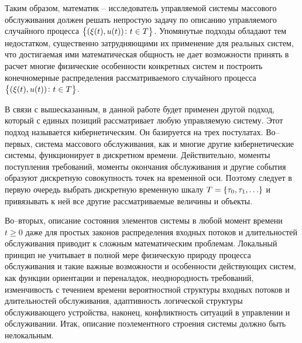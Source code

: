 \documentclass[a4paper,12pt,russian]{extarticle}
\begin{document}
Таким образом, математик -- исследователь управляемой системы массового обслуживания должен решать непростую задачу по описанию управляемого случайного процесса $\left\{(\xi(t), u(t)) \colon t \in T\right\}$. Упомянутые подходы обладают тем недостатком, существенно затрудняющими их применение для реальных систем, что достигаемая ими математическая общность не дает возможности принять в расчет многие физические особенности конкретных систем и построить конечномерные распределения рассматриваемого случайного процесса $\left\{(\xi(t), u(t)) \colon t \in T\right\}$.

В связи с вышесказанным, в данной работе будет применен другой подход, который с единых позиций рассматривает любую управляемую систему. Этот подход называется кибернетическим. Он базируется на трех постулатах. Во--первых, система массового обслуживания, как и многие другие кибернетические системы, функционирует в дискретном времени. Действительно, моменты поступления требований, моменты окончания обслуживания и другие события образуют дискретную совокупность точек на временной оси. Поэтому следует в первую очередь выбрать дискретную временную шкалу $T=\left\{\tau_0, \tau_1, \ldots\right\}$ и привязывать к ней все другие рассматриваемые величины и объекты. 

Во--вторых, описание состояния элементов системы в любой момент времени $t \geqslant 0$ даже для простых законов распределения входных потоков и длительностей обслуживания приводит к сложным математическим проблемам. Локальный принцип не учитывает в полной мере физическую природу процесса обслуживания и такие важные возможности и особенности действующих систем, как функции ориентации и переналадок, неоднородность требований, изменчивость с течением времени вероятностной структуры входных потоков и длительностей обслуживания, адаптивность логической структуры обслуживающего устройства, наконец, конфликтность ситуаций в управлении и обслуживании. Итак, описание поэлементного строения системы должно быть нелокальным.
\end{document}
